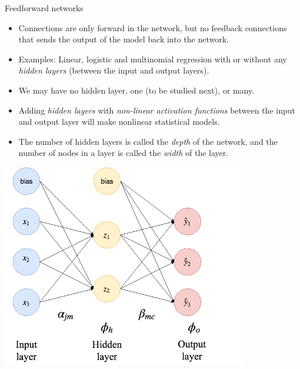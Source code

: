 \documentclass[10pt,ignorenonframetext,]{beamer}
\begin{document}
\begin{frame}{Feedforward networks}
\protect\hypertarget{feedforward-networks}{}

\begin{itemize}
\item
  Connections are only forward in the network, but no feedback
  connections that sends the output of the model back into the network.
\item
  Examples: Linear, logistic and multinomial regression with or without
  any \emph{hidden layers} (between the input and output layers).
\item
  We may have no hidden layer, one (to be studied next), or many.
\item
  Adding \emph{hidden layers} with \emph{non-linear activation
  functions} between the input and output layer will make nonlinear
  statistical models.
\item
  The number of hidden layers is called the \emph{depth} of the network,
  and the number of nodes in a layer is called the \emph{width} of the
  layer.
\end{itemize}

\end{frame}

\begin{frame}

\centering

\includegraphics[width=0.8\textwidth,height=\textheight]{drawNNp3h2o3.png}

\end{frame}
\end{document}
